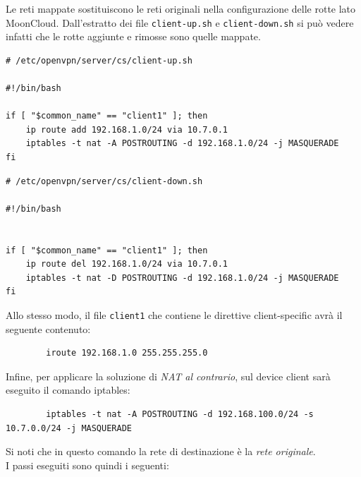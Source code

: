 	
	Le reti mappate sostituiscono le reti originali nella configurazione delle rotte lato
	MoonCloud. Dall'estratto dei file \texttt{client-up.sh} e
	\texttt{client-down.sh} si può vedere infatti che le rotte aggiunte e rimosse sono
	quelle mappate.
	\begin{verbatim}
# /etc/openvpn/server/cs/client-up.sh
		
#!/bin/bash
		
if [ "$common_name" == "client1" ]; then
	ip route add 192.168.1.0/24 via 10.7.0.1
	iptables -t nat -A POSTROUTING -d 192.168.1.0/24 -j MASQUERADE
fi
	\end{verbatim}
	\begin{verbatim}
# /etc/openvpn/server/cs/client-down.sh
		
#!/bin/bash
		
		
if [ "$common_name" == "client1" ]; then
	ip route del 192.168.1.0/24 via 10.7.0.1
	iptables -t nat -D POSTROUTING -d 192.168.1.0/24 -j MASQUERADE
fi
	\end{verbatim}
	Allo stesso modo, il file \texttt{client1} che contiene le direttive client-specific
	avrà il seguente contenuto:
	\begin{verbatim}
		iroute 192.168.1.0 255.255.255.0
	\end{verbatim}
	Infine, per applicare la soluzione di \textit{NAT al contrario}, sul device client
	sarà eseguito il comando iptables:
	\begin{verbatim}
		iptables -t nat -A POSTROUTING -d 192.168.100.0/24 -s 10.7.0.0/24 -j MASQUERADE
	\end{verbatim}
	Si noti che in questo comando la rete di destinazione è la \textit{rete originale}.\\
	I passi eseguiti sono quindi i seguenti:

